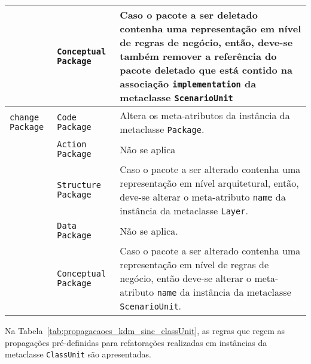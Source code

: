\begin{longtable}{ | m{1.9cm} | m{3.57cm}| m{9.3cm} | }
\cline{2-3}
& \texttt{Conceptual Package} & Caso o pacote a ser deletado contenha uma representação em nível de regras de negócio, então, deve-se também remover a referência do pacote deletado que está contido na associação \texttt{implementation} da metaclasse \texttt{ScenarioUnit} \tabularnewline
\hline
\texttt{change} \texttt{Package} & \texttt{Code Package} & Altera os meta-atributos da instância da metaclasse \texttt{Package}.\tabularnewline
\cline{2-3}
& \texttt{Action Package} & Não se aplica \tabularnewline
\cline{2-3}
& \texttt{Structure Package} & Caso o pacote a ser alterado contenha uma representação em nível arquitetural, então, deve-se alterar o meta-atributo \texttt{name} da instância da metaclasse \texttt{Layer}. \tabularnewline
\cline{2-3}
& \texttt{Data Package} & Não se aplica. \tabularnewline
\cline{2-3}
& \texttt{Conceptual Package} & Caso o pacote a ser alterado contenha uma representação em nível de regras de negócio, então deve-se alterar o meta-atributo \texttt{name} da instância da metaclasse \texttt{ScenarioUnit}. \tabularnewline
 \end{longtable}

Na Tabela~\ref{tab:propagacaoes_kdm_sinc_classUnit}, as regras que regem as propagações pré-definidas para refatorações realizadas em instâncias da metaclasse \texttt{ClassUnit} são apresentadas.

